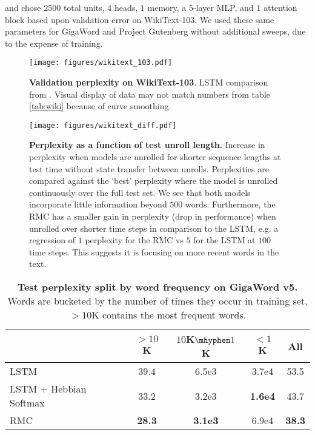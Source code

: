 \documentclass{article}
\begin{document}
and chose $2500$ total units, $4$ heads, $1$ memory, a $5$-layer MLP, and $1$ attention block based upon validation error on WikiText-103. We used these same parameters for GigaWord and Project Gutenberg without additional sweeps, due to the expense of training.

\begin{figure}[h!]
    \centering
    \texttt{[image: figures/wikitext\_103.pdf]}
    \caption{\textbf{Validation perplexity on WikiText-103}. LSTM comparison from \cite{rae2018fast}. Visual display of data may not match numbers from table \ref{tab:wiki} because of curve smoothing.}
    \label{fig:wiki_curves}
\end{figure}

\begin{figure}[h!]
    \centering
    \texttt{[image: figures/wikitext\_diff.pdf]}
    \caption{\textbf{Perplexity as a function of test unroll length.} Increase in perplexity when models are unrolled for shorter sequence lengths at test time without state transfer between unrolls. Perplexities are compared against the `best' perplexity where the model is unrolled continuously over the full test set. We see that both models incorporate little information beyond $500$ words. Furthermore, the RMC has a smaller gain in perplexity (drop in performance) when unrolled over shorter time steps in comparison to the LSTM, e.g. a regression of $1$ perplexity for the RMC vs $5$ for the LSTM at $100$ time steps. This suggests it is focusing on more recent words in the text.}
    \label{fig:wiki_context_length}
\end{figure}

\begin{table}[h!]
    \caption{\textbf{Test perplexity split by word frequency on GigaWord v5.} Words are bucketed by the number of times they occur in training set, $>10$K contains the most frequent words.}
    \centering
    \begin{tabular}{lcccc}
    \toprule
    & $>10$K & $10$K$ \mhyphen 1$K & $<1$K & All \\ 
    \midrule
    LSTM                   \cite{rae2018fast} & 39.4 & 6.5e3 & 3.7e4 & 53.5  \\ 
    LSTM + Hebbian Softmax \cite{rae2018fast} & 33.2 & 3.2e3 & \textbf{1.6e4} & 43.7 \\ 
    RMC                     & \textbf{28.3} & \textbf{3.1e3} & 6.9e4 & \textbf{38.3} \\
    \bottomrule
    \end{tabular}
    \label{tab:giga_word_frequency}
\end{table}


 
\end{document}
